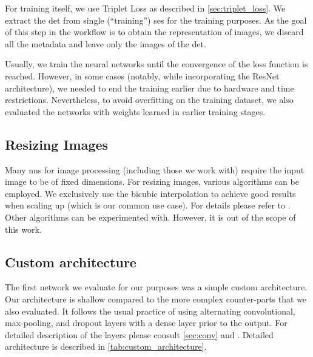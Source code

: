 For training itself, we use Triplet Loss as described in \autoref{sec:triplet_loss}. We extract the \gls{det} from single (``training'') \gls{ses} for the training purposes. As the goal of this step in the workflow is to obtain the representation of images, we discard all the metadata and leave only the images of the \gls{det}.


Usually, we train the neural networks until the convergence of the loss function is reached. However, in some cases (notably, while incorporating the ResNet architecture), we needed to end the training earlier due to hardware and time restrictions. Nevertheless, to avoid overfitting on the training dataset, we also evaluated the networks with weights learned in earlier training stages.

\subsection{Resizing Images}

Many \glspl{nn} for image processing (including those we work with) require the input image to be of fixed dimensions. For resizing images, various algorithms can be employed. We exclusively use the bicubic interpolation to achieve good results when scaling up (which is our common use case). For details please refer to \cite{keys1981cubic}. Other algorithms can be experimented with. However, it is out of the scope of this work.

\subsection{Custom architecture}

The first network we evaluate for our purposes was a simple custom architecture. Our architecture is shallow compared to the more complex counter-parts that we also evaluated. It follows the usual practice of using alternating convolutional, max-pooling, and dropout layers with a dense layer prior to the output. For detailed description of the layers please consult \autoref{sec:conv} and \cite{deeplearningbook}. Detailed architecture is described in \autoref{tab:custom_architecture}.


